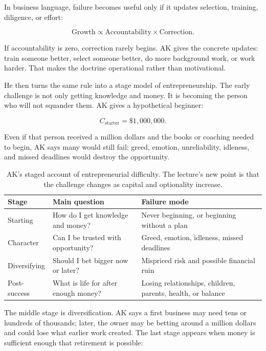 \documentclass[11pt,oneside]{book}
\begin{document}
In business language, failure becomes useful only if it updates selection, training, diligence, or effort:

\begin{equation}
\mathrm{Growth}
\propto
\mathrm{Accountability}
\times
\mathrm{Correction}.
\end{equation}

If accountability is zero, correction rarely begins. AK gives the concrete updates: train someone better, select someone better, do more background work, or work harder. That makes the doctrine operational rather than motivational.

He then turns the same rule into a stage model of entrepreneurship. The early challenge is not only getting knowledge and money. It is becoming the person who will not squander them. AK gives a hypothetical beginner:

\begin{equation}
C_{\mathrm{starter}}=\$1{,}000{,}000.
\end{equation}

Even if that person received a million dollars and the books or coaching needed to begin, AK says many would still fail: greed, emotion, unreliability, idleness, and missed deadlines would destroy the opportunity.

\begin{table}
\centering
\begin{tabular}{|p{.23\linewidth}|p{.31\linewidth}|p{.32\linewidth}|}
\hline
Stage & Main question & Failure mode\\
\hline
Starting & How do I get knowledge and money? & Never beginning, or beginning without a plan\\
\hline
Character & Can I be trusted with opportunity? & Greed, emotion, idleness, missed deadlines\\
\hline
Diversifying & Should I bet bigger now or later? & Mispriced risk and possible financial ruin\\
\hline
Post-success & What is life for after enough money? & Losing relationships, children, parents, health, or balance\\
\hline
\end{tabular}
\caption{AK's staged account of entrepreneurial difficulty. The lecture's new point is that the challenge changes as capital and optionality increase.}
\end{table}

The middle stage is diversification. AK says a first business may need tens or hundreds of thousands; later, the owner may be betting around a million dollars and could lose what earlier work created. The last stage appears when money is sufficient enough that retirement is possible:
\end{document}
